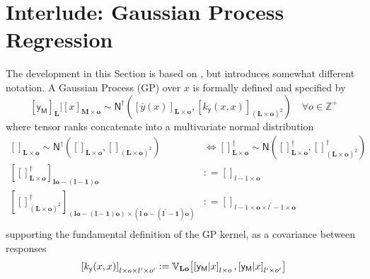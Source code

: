 \documentclass[preprint,12pt]{elsarticle}
\newcommand*{\M}[1]{\ensuremath{#1}\xspace}
\newcommand*{\x}{\times}
\newcommand*{\mi}[1]{\mathbf{#1}}
\newcommand*{\st}[1]{\mathbb{#1}}
\newcommand*{\rv}[1]{\mathsf{#1}}
\newcommand*{\te}[2][]{\left\lbrack{#2}\right\rbrack_{#1}}
\newcommand*{\deq}{\M{\mathrel{\mathop:}=}}
\newcommand*{\cov}[3][]{\ifthenelse{\equal{#1}{}}{\mathbb{V}_{#3}\!\left\lbrack{#2}\right\rbrack}{\mathbb{V}_{#3}\!\left\lbrack{#2,#1}\right\rbrack}}
\newcommand*{\gauss}[2]{\mathsf{N}\!\left({#1,#2}\right)}
\newcommand*{\gaussd}[2]{\mathsf{N}^{\dagger}\!\left({#1,#2}\right)}
\begin{document}
\section{Interlude: Gaussian Process Regression} \label{sec:GPR}
    The development in this Section is based on \cite{Alvarez.etal2011}, but introduces somewhat different notation. A Gaussian Process (GP) over $x$ is formally defined and specified by
    \begin{equation*}
        \te[\mi{L}]{\rv{y_M}} \big\vert \te[\mi{M}\x\mi{o}]{x} \sim 
        \gaussd{\te[\mi{L}\x\mi{o}]{\bar{y}(x)}}{\te[(\mi{L}\x\mi{o})^{2}]
        {k_{\rv{y}}(x,x)}} \quad \forall o \in \st{Z^{+}}
    \end{equation*}
    where tensor ranks concatenate into a multivariate normal distribution
    \begin{equation*}
        \begin{aligned}
            \te[\mi{L}\x\mi{o}]{} \sim \gaussd{\te[\mi{L}\x\mi{o}]{}}{\te[(\mi{L\x o})^{2}]{}}
            & \Longleftrightarrow
            \te[\mi{L}\x\mi{o}]{}^{\dagger} \sim \gauss{\te[\mi{L}\x\mi{o}]{}^{\dagger}}{\te[(\mi{L\x o})^{2}]{}^{\dagger}} \\
            \te[\mi{lo}-\mi{(l-1)o}]{\te[\mi{L}\x\mi{o}]{}^{\dagger}} 
            &\deq \te[l-1\x\mi{o}]{} \\
            \te[(\mi{lo}-(\mi{l-1})\mi{o}) \x (\mi{l^{\prime}o}-\mi{(l^{\prime}-1)o})]
            {\te[(\mi{L\x o})^{2}]{}^{\dagger}} 
            &\deq \te[l-1\x\mi{o} \x l^{\prime}-1\x\mi{o}]{} \\
        \end{aligned}
    \end{equation*}
    supporting the fundamental definition of the GP kernel, as a covariance between responses
    \begin{equation*}
        \te[l\x o\x l^{\prime}\x o^{\prime}]{k_{\rv{y}}(x,x)} 
        \deq \cov[{\te[l^{\prime}\x o^{\prime}]{\rv{y_M}\vert x}}]{\te[l\x o]{\rv{y_M}\vert x}}{\mi{Lo}}
    \end{equation*}
\end{document}

